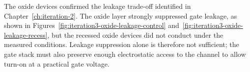 \vspace{1mm}

The oxide devices confirmed the leakage trade-off identified in
Chapter~\ref{ch:iteration-2}. The oxide layer strongly suppressed gate leakage,
as shown in Figures~\ref{fig:iteration3-oxide-leakage-control}
and~\ref{fig:iteration3-oxide-leakage-recess}, but the recessed oxide devices
did not conduct under the measured conditions. Leakage suppression alone is
therefore not sufficient; the gate stack must also preserve enough
electrostatic access to the channel to allow turn-on at a practical gate
voltage.
